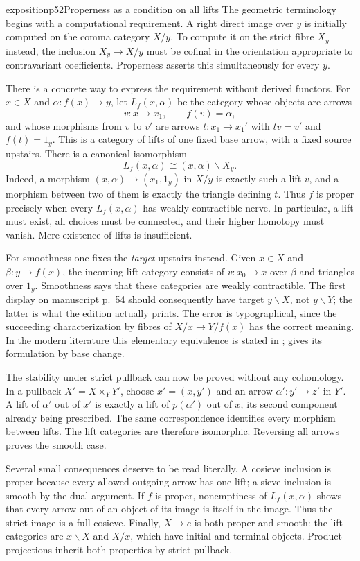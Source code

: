 \begin{dcomment}{exposition}{p52}{Properness as a condition on all lifts}
The geometric terminology begins with a computational requirement. A right direct image over $y$ is initially computed on the comma category $X/y$. To compute it on the strict fibre $X_y$ instead, the inclusion $X_y\to X/y$ must be cofinal in the orientation appropriate to contravariant coefficients. Properness asserts this simultaneously for every $y$.

There is a concrete way to express the requirement without derived functors. For $x\in X$ and $\alpha:f(x)\to y$, let $L_f(x,\alpha)$ be the category whose objects are arrows
\[
 v:x\longrightarrow x_1,\qquad f(v)=\alpha,
\]
and whose morphisms from $v$ to $v'$ are arrows $t:x_1\to x_1'$ with $tv=v'$ and $f(t)=1_y$. This is a category of lifts of one fixed base arrow, with a fixed source upstairs. There is a canonical isomorphism
\[
 L_f(x,\alpha)\cong (x,\alpha)\backslash X_y.
\]
Indeed, a morphism $(x,\alpha)\to(x_1,1_y)$ in $X/y$ is exactly such a lift $v$, and a morphism between two of them is exactly the triangle defining $t$. Thus $f$ is proper precisely when every $L_f(x,\alpha)$ has weakly contractible nerve. In particular, a lift must exist, all choices must be connected, and their higher homotopy must vanish. Mere existence of lifts is insufficient.

For smoothness one fixes the \emph{target} upstairs instead. Given $x\in X$ and $\beta:y\to f(x)$, the incoming lift category consists of $v:x_0\to x$ over $\beta$ and triangles over $1_y$. Smoothness says that these categories are weakly contractible. The first display on manuscript p.~54 should consequently have target $y\backslash X$, not $y\backslash Y$; the latter is what the edition actually prints. The error is typographical, since the succeeding characterization by fibres of $X/x\to Y/f(x)$ has the correct meaning. In the modern literature this elementary equivalence is stated in \citet[Definition~3.2.1 and Proposition~3.2.3]{Maltsiniotis2020}; \citet[Theorem~1.2]{Maltsiniotis2005Asphericite} gives its formulation by base change.

The stability under strict pullback can now be proved without any cohomology. In a pullback $X'=X\times_Y Y'$, choose $x'=(x,y')$ and an arrow $\alpha':y'\to z'$ in $Y'$. A lift of $\alpha'$ out of $x'$ is exactly a lift of $p(\alpha')$ out of $x$, its second component already being prescribed. The same correspondence identifies every morphism between lifts. The lift categories are therefore isomorphic. Reversing all arrows proves the smooth case.

Several small consequences deserve to be read literally. A cosieve inclusion is proper because every allowed outgoing arrow has one lift; a sieve inclusion is smooth by the dual argument. If $f$ is proper, nonemptiness of $L_f(x,\alpha)$ shows that every arrow out of an object of its image is itself in the image. Thus the strict image is a full cosieve. Finally, $X\to e$ is both proper and smooth: the lift categories are $x\backslash X$ and $X/x$, which have initial and terminal objects. Product projections inherit both properties by strict pullback.
\end{dcomment}

